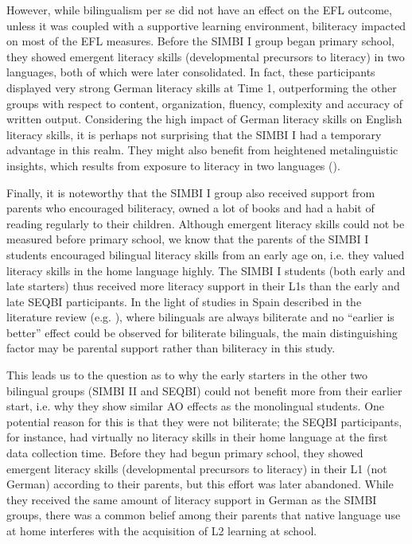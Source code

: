 \documentclass[output=paper,modfonts,nonflat,newtxmath]{langsci/langscibook}
\begin{document}
However, while bilingualism per se did not have an effect on the EFL outcome, unless it was coupled with a supportive learning environment, biliteracy impacted on most of the EFL measures. Before the SIMBI I group began primary school, they showed emergent literacy skills (developmental precursors to literacy) in two languages, both of which were later consolidated. In fact, these participants displayed very strong German literacy skills at Time 1, outperforming the other groups with respect to content, organization, fluency, complexity and accuracy of written output. Considering the high impact of German literacy skills on English literacy skills, it is perhaps not surprising that the SIMBI I had a temporary advantage in this realm. They might also benefit from heightened metalinguistic insights, which results from exposure to literacy in two languages (\citealt{Sanz2000, Bialystok2007}).

Finally, it is noteworthy that the SIMBI I group also received support from parents who encouraged biliteracy, owned a lot of books and had a habit of reading regularly to their children. Although emergent literacy skills could not be measured before primary school, we know that the parents of the SIMBI I students encouraged bilingual literacy skills from an early age on, i.e. they valued literacy skills in the home language highly. The SIMBI I students (both early and late starters) thus received more literacy support in their L1s than the early and late SEQBI participants. In the light of studies in Spain described in the literature review (e.g. \citealt{Sanz2008}), where bilinguals are always biliterate and no “earlier is better” effect could be observed for biliterate bilinguals, the main distinguishing factor may be parental support rather than biliteracy in this study.

This leads us to the question as to why the early starters in the other two bilingual groups (SIMBI II and SEQBI) could not benefit more from their earlier start, i.e. why they show similar AO effects as the monolingual students. One potential reason for this is that they were not biliterate; the SEQBI participants, for instance, had virtually no literacy skills in their home language at the first data collection time. Before they had begun primary school, they showed emergent literacy skills (developmental precursors to literacy) in their L1 (not German) according to their parents, but this effort was later abandoned. While they received the same amount of literacy support in German as the SIMBI groups, there was a common belief among their parents that native language use at home interferes with the acquisition of L2 learning at school.
\end{document}
